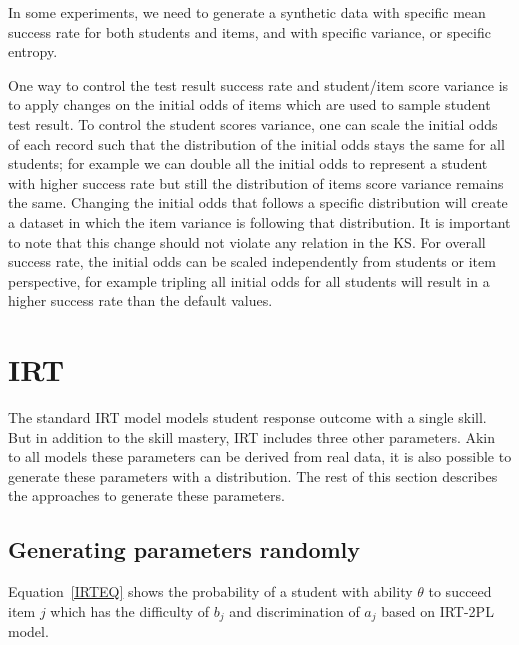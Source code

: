 In some experiments, we need to generate a synthetic data with specific mean success rate for both students and items, and with specific variance, or specific entropy.

One way to control the test result success rate and student/item score variance is to apply changes on the initial odds of items which are used to sample student test result. To control the student scores variance, one can scale the initial odds of each record such that the distribution of the initial odds stays the same for all students; for example we can double all the initial odds to represent a student with higher success rate but still the distribution of items score variance remains the same. Changing the initial odds that follows a specific distribution will create a dataset in which the item variance is following that distribution. It is important to note that this change should not violate any relation in the KS. For overall success rate, the initial odds can be scaled independently from students or item perspective, for example tripling all initial odds for all students will result in a higher success rate than the default values.


\section{IRT}

The standard IRT model models student response outcome with a single skill. But in addition to the skill mastery, IRT includes three other parameters. Akin to all models these parameters can be derived from real data, it is also possible to generate these parameters with a distribution. The rest of this section describes the approaches to generate these parameters.

\subsection{Generating parameters randomly}
Equation~\ref{IRTEQ} shows the probability of a student with ability $\theta$ to succeed item $j$ which has the difficulty of $b_j$ and discrimination of $a_j$ based on IRT-2PL model. 


